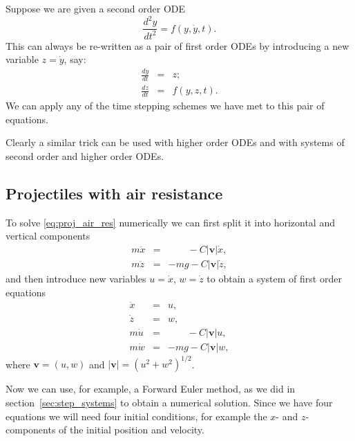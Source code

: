 Suppose we are given a second order ODE
\begin{equation}
\frac{d^2 y}{d t^2} = f(y, \dot{y}, t) .
\end{equation}
This can always be re-written as a pair of first order ODEs by introducing a
new variable $z = \dot{y}$, say:
\begin{eqnarray}
\frac{d y}{d t} & = & z ; \nonumber \\
\frac{d z}{d t} & = & f(y, z, t) . \nonumber
\end{eqnarray}
We can apply any of the time stepping schemes we have met to this
pair of equations.

Clearly a similar trick can be used with higher order ODEs and with systems
of second order and higher order ODEs.


\subsection{Projectiles with air resistance}
\label{sec:air_resistance_examples}

To solve \eqref{eq:proj_air_res} numerically we can first split it into
horizontal and vertical components
\begin{eqnarray}
m \ddot{x} & = & \ \ \ \ \ \ \ \ \ - C |\boldsymbol{v}| \dot{x} , \nonumber \\
m \ddot{z} & = & -m g              - C |\boldsymbol{v}| \dot{z} , \nonumber
\end{eqnarray}
and then introduce new variables $u = \dot{x}$, $w = \dot{z}$ to obtain
a system of first order equations
\begin{eqnarray}
  \dot{x}  & = & u , \nonumber \\
  \dot{z}  & = & w , \nonumber \\
m \dot{u} & = & \ \ \ \ \ \ \ \ \ - C |\boldsymbol{v}| u , \nonumber \\
m \dot{w} & = & - m g             - C |\boldsymbol{v}| w , \nonumber
\end{eqnarray}
where $\boldsymbol{v} = (u,w)$ and $|\boldsymbol{v}| = (u^2 + w^2)^{1/2}$.

Now we can use, for example, a Forward Euler method, as we did
in section~\ref{sec:step_systems} to obtain a numerical solution.
Since we have four equations we will need four initial conditions, for
example the $x$- and $z$-components of the initial position and velocity.

